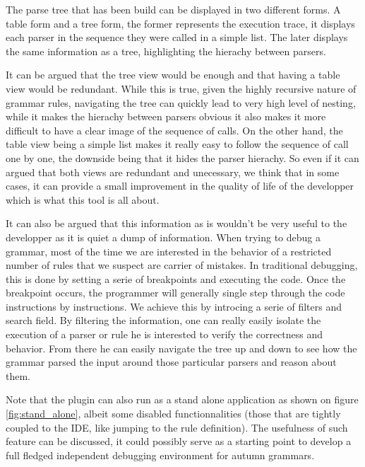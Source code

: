 	The parse tree that has been build can be displayed in two different forms. A table form and a tree form, the former represents the execution trace, it displays each parser in the sequence they were called in a simple list. The later displays the same information as a tree, highlighting the hierachy between parsers.

	\bigskip

	It can be argued that the tree view would be enough and that having a table view would be redundant. While this is true, given the highly recursive nature of grammar rules, navigating the tree can quickly lead to very high level of nesting, while it makes the hierachy between parsers obvious it also makes it more difficult to have a clear image of the sequence of calls. On the other hand, the table view being a simple list makes it really easy to follow the sequence of call one by one, the downside being that it hides the parser hierachy. So even if it can argued that both views are redundant and unecessary, we think that in some cases, it can provide a small improvement in the quality of life of the developper which is what this tool is all about.

	\bigskip

	It can also be argued that this information as is wouldn't be very useful to the developper as it is quiet a dump of information. When trying to debug a grammar, most of the time we are interested in the behavior of a restricted number of rules that we suspect are carrier of mistakes. In traditional debugging, this is done by setting a serie of breakpoints and executing the code. Once the breakpoint occurs, the programmer will generally single step through the code instructions by instructions. %
	We achieve this by introcing a serie of filters and search field. By filtering the information, one can really easily isolate the execution of a parser or rule he is interested to verify the correctness and behavior. From there he can easily navigate the tree up and down to see how the grammar parsed the input around those particular parsers and reason about them.

	\bigskip

	Note that the plugin can also run as a stand alone application as shown on figure \ref{fig:stand_alone}, albeit some disabled functionnalities (those that are tightly coupled to the IDE, like jumping to the rule definition). The usefulness of such feature can be discussed, it could possibly serve as a starting point to develop a full fledged independent debugging environment for autumn grammars. 

